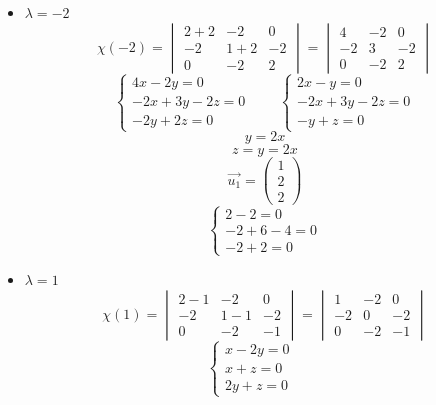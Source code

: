 \begin{itemize}
	\item $ \lambda = -2 $
    $$ \chi(-2) =
    \begin{vmatrix}
    	2 + 2 & -2 & 0 \\
        -2 & 1 + 2 & -2 \\
        0 & -2 & 2
    \end{vmatrix} =
    \begin{vmatrix}
    	4 & -2 & 0 \\
        -2 & 3 & -2 \\
        0 & -2 & 2
    \end{vmatrix} $$
    $$
    \begin{cases}
    	4x - 2y = 0 \\
        -2x + 3y - 2z = 0 \\
        -2y + 2z = 0
    \end{cases} \qquad
    \begin{cases}
    	2x - y = 0 \\
        -2x + 3y - 2z = 0 \\
        -y + z = 0
    \end{cases} $$
    $$ y = 2x $$
    $$ z = y = 2x $$
    $$ \vec{u_1} =
    \begin{pmatrix}
    	1 \\
        2 \\
        2
    \end{pmatrix} $$
    $$
    \begin{cases}
        2 - 2 = 0 \\
        -2 + 6 - 4 = 0 \\
        -2 + 2 = 0
    \end{cases} $$
    \item $ \lambda = 1 $
    $$ \chi(1) =
    \begin{vmatrix}
    	2 - 1 & -2 & 0 \\
        -2 & 1 - 1 & -2 \\
        0 & -2 & -1
    \end{vmatrix} =
    \begin{vmatrix}
    	1 & -2 & 0 \\
        -2 & 0 & -2 \\
        0 & -2 & -1
    \end{vmatrix} $$
    $$
    \begin{cases}
    	x - 2y = 0 \\
        x + z = 0 \\
        2y + z = 0
    \end{cases} \qquad
$$
\end{itemize}
